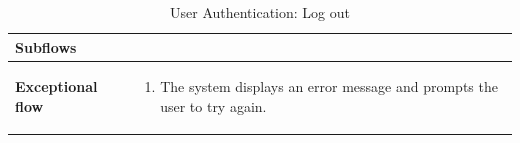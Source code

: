 \documentclass[../thesis.tex]{subfiles}
\begin{document}
\begin{center}
\begin{table}[H]
{\begin{tabular}[htbp]{|p{}|p{}|}
                \textbf{Subflows              }  &                                                                              \\ \hline
                \textbf{Exceptional flow       } & \begin{enumerate}
                                                       \item The system displays an error message and prompts the user to try again.
                                                   \end{enumerate} \\ \hline
            \end{tabular}%
        }
        \caption{User Authentication: Log out}
        \label{tab:table-usecase-logout}


    \end{table}
\end{center}
\end{document}
